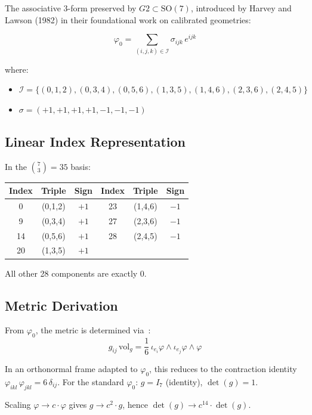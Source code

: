 \documentclass[11pt,a4paper]{article}
\newcommand{\Gtwo}{\mathrm{G}_2}
\newcommand{\SO}{\mathrm{SO}}
\def\Gtwo{G2}%
\begin{document}
The associative 3-form preserved by $\Gtwo \subset \SO(7)$, introduced by Harvey and Lawson (1982) in their foundational work on calibrated geometries:

$$\varphi_0 = \sum_{(i,j,k) \in \mathcal{I}} \sigma_{ijk} \, e^{ijk}$$

where:
\begin{itemize}
\item $\mathcal{I} = \{(0,1,2), (0,3,4), (0,5,6), (1,3,5), (1,4,6), (2,3,6), (2,4,5)\}$
\item $\sigma = (+1, +1, +1, +1, -1, -1, -1)$
\end{itemize}

\subsection{Linear Index Representation}

In the $\binom{7}{3} = 35$ basis:

\begin{table}[H]
\centering
\begin{tabular}{cccccc}
\toprule
Index & Triple & Sign & Index & Triple & Sign \\
\midrule
0 & (0,1,2) & $+1$ & 23 & (1,4,6) & $-1$ \\
9 & (0,3,4) & $+1$ & 27 & (2,3,6) & $-1$ \\
14 & (0,5,6) & $+1$ & 28 & (2,4,5) & $-1$ \\
20 & (1,3,5) & $+1$ & & & \\
\bottomrule
\end{tabular}
\end{table}

All other 28 components are exactly 0.

\subsection{Metric Derivation}

From $\varphi_0$, the metric is determined via~\cite{bryant1987}:
$$g_{ij}\,\mathrm{vol}_g = \frac{1}{6}\,\iota_{e_i}\varphi \wedge \iota_{e_j}\varphi \wedge \varphi$$

In an orthonormal frame adapted to $\varphi_0$, this reduces to the contraction identity $\varphi_{ikl}\,\varphi_{jkl} = 6\,\delta_{ij}$. For the standard $\varphi_0$: $g = I_7$ (identity), $\det(g) = 1$.

Scaling $\varphi \to c\cdot\varphi$ gives $g \to c^2\cdot g$, hence $\det(g) \to c^{14}\cdot\det(g)$.
\end{document}
